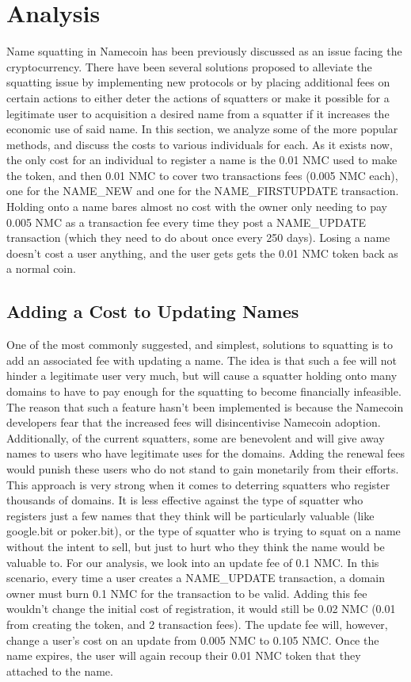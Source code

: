 \section{Analysis}
\label{sec:analysis}


    Name squatting in Namecoin has been previously discussed as an issue facing the cryptocurrency. There have been several solutions proposed to alleviate the squatting issue by implementing new protocols or by placing additional fees on certain actions to either deter the actions of squatters or make it possible for a legitimate user to acquisition a desired name from a squatter if it increases the economic use of said name. In this section, we analyze some of the more popular methods, and discuss the costs to various individuals for each. 
    As it exists now, the only cost for an individual to register a name is the 0.01 NMC used to make the token, and then 0.01 NMC to cover two transactions fees (0.005 NMC each), one for the NAME\_NEW and one for the NAME\_FIRSTUPDATE transaction. Holding onto a name bares almost no cost with the owner only needing to pay 0.005 NMC as a transaction fee every time they post a NAME\_UPDATE transaction (which they need to do about once every 250 days). Losing a name doesn't cost a user anything, and the user gets gets the 0.01 NMC token back as a normal coin. 

\subsection{Adding a Cost to Updating Names}
    One of the most commonly suggested, and simplest, solutions to squatting is to add an associated fee with updating a name. The idea is that such a fee will not hinder a legitimate user very much, but will cause a squatter holding onto many domains to have to pay enough for the squatting to become financially infeasible. The reason that such a feature hasn't been implemented is because the Namecoin developers fear that the increased fees will disincentivise Namecoin adoption. Additionally, of the current squatters, some are benevolent and will give away names to users who have legitimate uses for the domains. Adding the renewal fees would punish these users who do not stand to gain monetarily from their efforts. This approach is very strong when it comes to deterring squatters who register thousands of domains. It is less effective against the type of squatter who registers just a few names that they think will be particularly valuable (like google.bit or poker.bit), or the type of squatter who is trying to squat on a name without the intent to sell, but just to hurt who they think the name would be valuable to.
For our analysis, we look into an update fee of 0.1 NMC. In this scenario, every time a user creates a NAME\_UPDATE transaction, a domain owner must burn 0.1 NMC for the transaction to be valid. Adding this fee wouldn't change the initial cost of registration, it would still be 0.02 NMC (0.01 from creating the token, and 2 transaction fees). The update fee will, however, change a user's cost on an update from 0.005 NMC to 0.105 NMC. Once the name expires, the user will again recoup their 0.01 NMC token that they attached to the name. 

